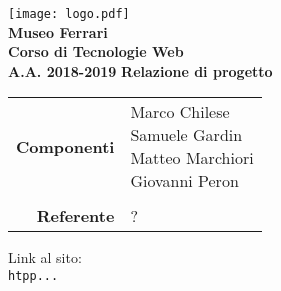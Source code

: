 


\begin{titlepage}
\thispagestyle{empty}

\begin{center}

\texttt{[image: logo.pdf]}\\ 
\large \textbf{Museo Ferrari\\ \small Corso di Tecnologie Web\\ A.A. 2018-2019}
\vfill
\Huge \textbf{Relazione di progetto}
\vfill
\large
\renewcommand{\arraystretch}{1.3}
\begin{tabular}{r|l}
\textbf{Componenti} & \parbox[t]{5cm}{Marco Chilese\\Samuele Gardin\\Matteo Marchiori\\Giovanni Peron}\\
\-\\
\textbf{Referente} & \parbox[t]{5cm}{?}\\
\end{tabular}
\vfill
\small
Link al sito:\\
\texttt{htpp...}
\end{center}
\end{titlepage}

\pagebreak

\tableofcontents

\pagebreak




\pagebreak



\pagebreak



\pagebreak



\pagebreak



\pagebreak



\pagebreak



\pagebreak



\pagebreak



\pagebreak



\pagebreak




